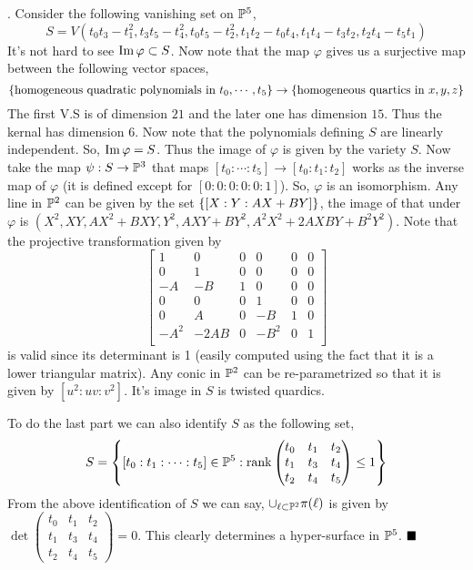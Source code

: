 \documentclass[12pt]{article}
\begin{document}
\sol. Consider the following vanishing set on $\mathbb{P}^5$, $$S = V(t_0t_3-t_1^2, t_3t_5-t_4^2,t_0t_5-t_2^2,t_1t_2-t_0t_4,t_1t_4-t_3t_2,t_2t_4-t_5t_1)$$
It's not hard to see $\operatorname{Im} \varphi \subset S$. Now note that the map $\varphi$ gives us a surjective map between the following vector spaces, \[
    \qty{\text{homogeneous quadratic polynomials in }t_0,\cdots,t_5} \to  \qty{\text{homogeneous quartics in } x,y,z}
\]
The first V.S is of dimension $21$ and the later one has dimension $15$. Thus the kernal has dimension $6$. Now note that the polynomials defining $S$ are linearly independent. So, $\operatorname{Im} \varphi = S$. Thus the image of $\varphi$ is given by the variety $S$. Now take the map $\psi : S \to \mathbb{P}^3$ that maps $[t_0:\cdots:t_5] \to [t_0:t_1:t_2]$ works as the inverse map of $\varphi$ (it is defined except for $[0:0:0:0:0:1]$). So, $\varphi$ is an isomorphism.  Any line in $\mathbb{P}^2$ can be given by the set $\qty{[X:Y:AX+BY]}$, the image of that under $\varphi$ is $(X^2, XY, AX^2+BXY, Y^2, AXY + BY^2, A^2X^2 + 2AXBY + B^2Y^2)$. Note that the projective transformation given by
\[
  \begin{bmatrix}
    1 & 0 & 0 & 0 & 0 & 0 \\
    0 & 1 & 0 & 0 & 0 & 0 \\
    -A & -B & 1 & 0 & 0 & 0 \\
    0 & 0 & 0 & 1 & 0 & 0 \\
    0 & A & 0 & -B & 1 & 0 \\
    -A^2 & -2AB & 0 & -B^2 & 0 & 1 \\
  \end{bmatrix}
\]
is valid since its determinant is 1 (easily computed using the fact that it is a lower triangular matrix). Any conic in $\mathbb{P}^2$ can be re-parametrized so that it is given by $[u^2:uv:v^2]$. It's image in $S$ is twisted quardics.
\vspace*{0.2cm}

\noindent To do the last part we can also identify $S$ as the following set,\[S = \qty{ [t_0:t_1:\cdots:t_5] \in \mathbb{P}^5:\operatorname{rank }\begin{pmatrix}
            t_0 & t_1 & t_2 \\
            t_1 & t_3 & t_4 \\
            t_2 & t_4 & t_5
        \end{pmatrix} \leq 1}\] From the above identification of $S$ we can say, $\cup_{\ell \subset \mathbb{P}^2}\pi(\ell)$ is given by $\det \begin{pmatrix}
        t_0 & t_1 & t_2 \\
        t_1 & t_3 & t_4 \\
        t_2 & t_4 & t_5
    \end{pmatrix}=0$. This clearly determines a hyper-surface in $\mathbb{P}^5$. $\hfill \blacksquare$
\end{document}

